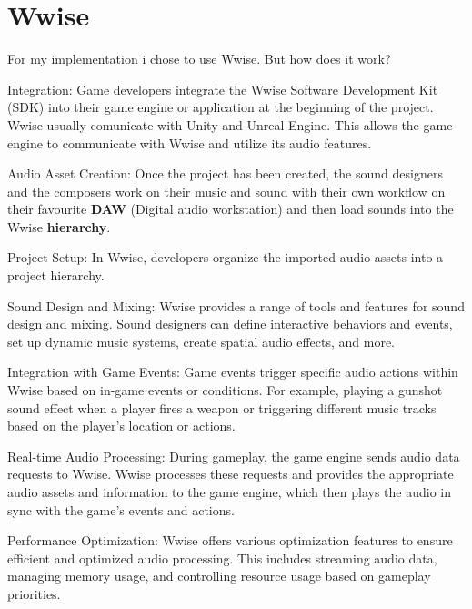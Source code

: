 \section{Wwise}
For my implementation i chose to use Wwise. But how does it work?

\begin{compactitem}
	\item Integration: Game developers integrate the Wwise Software Development Kit (SDK) into their game engine or application at the beginning of the project. Wwise usually comunicate with Unity and Unreal Engine. This allows the game engine to communicate with Wwise and utilize its audio features.

	\item Audio Asset Creation: Once the project has been created, the sound designers and the composers work on their music and sound with their own workflow on their favourite \textbf{DAW} (Digital audio workstation) and then load sounds into the Wwise \textbf{hierarchy}.

	\item Project Setup: In Wwise, developers organize the imported audio assets into a project hierarchy.

	\item Sound Design and Mixing: Wwise provides a range of tools and features for sound design and mixing. Sound designers can define interactive behaviors and events, set up dynamic music systems, create spatial audio effects, and more.

	\item Integration with Game Events: Game events trigger specific audio actions within Wwise based on in-game events or conditions. For example, playing a gunshot sound effect when a player fires a weapon or triggering different music tracks based on the player's location or actions.

	\item Real-time Audio Processing: During gameplay, the game engine sends audio data requests to Wwise. Wwise processes these requests and provides the appropriate audio assets and information to the game engine, which then plays the audio in sync with the game's events and actions.

	\item Performance Optimization: Wwise offers various optimization features to ensure efficient and optimized audio processing. This includes streaming audio data, managing memory usage, and controlling resource usage based on gameplay priorities.
\end{compactitem}

